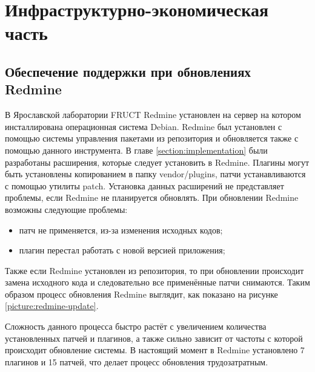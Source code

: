 \chapter{Инфраструктурно-экономическая часть}
\section{Обеспечение поддержки при обновлениях Redmine}
В Ярославской лаборатории FRUCT Redmine установлен на сервер на котором
инсталлирована операционная система Debian. Redmine был установлен с помощью
системы управления пакетами из репозитория и обновляется также с помощью
данного инструмента. В главе \ref{section:implementation} были разработаны
расширения, которые следует установить в Redmine. Плагины могут быть
установлены копированием в папку vendor/plugins,  патчи устанавливаются с
помощью утилиты patch. Установка данных расширений не представляет проблемы, если Redmine не
планируется обновлять. При обновлении Redmine возможны следующие проблемы:
\begin{itemize}
  \item патч не применяется, из-за изменения исходных кодов;
  \item плагин перестал работать с новой версией приложения;
\end{itemize}
Также если Redmine установлен из репозитория, то при обновлении происходит
замена исходного кода и следовательно все применённые патчи снимаются. Таким
образом процесс обновления Redmine выглядит, как показано на рисунке
\ref{picture:redmine-update}.


Сложность данного процесса быстро растёт с увеличением количества установленных
патчей и плагинов, а также сильно зависит от частоты с которой происходит
обновление системы. В настоящий момент в Redmine установлено 7 плагинов и 15
патчей, что делает процесс обновления трудозатратным.


